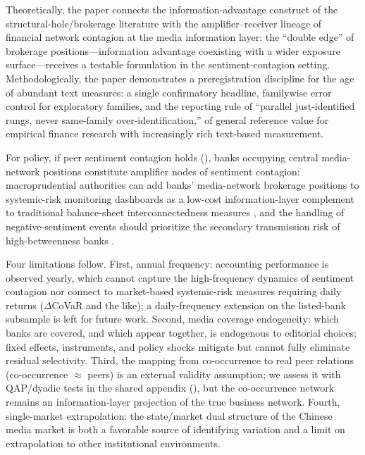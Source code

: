 Theoretically, the paper connects the information-advantage
construct of the structural-hole/brokerage literature with the
amplifier--receiver lineage of financial network contagion at the
media information layer: the ``double edge'' of brokerage
positions---information advantage coexisting with a wider exposure
surface---receives a testable formulation in the sentiment-contagion
setting. Methodologically, the paper demonstrates a preregistration
discipline for the age of abundant text measures: a single
confirmatory headline, familywise error control for exploratory
families, and the reporting rule of ``parallel just-identified rungs,
never same-family over-identification,'' of general reference value
for empirical finance research with increasingly rich text-based
measurement.

For policy, if peer sentiment contagion holds
(), banks occupying
central media-network positions constitute amplifier nodes of
sentiment contagion: macroprudential authorities can add banks'
media-network brokerage positions to systemic-risk monitoring
dashboards as a low-cost information-layer complement to traditional
balance-sheet interconnectedness measures
\parencite{jackson2021systemic,duarte2021firesale}, and the handling
of negative-sentiment events should prioritize the secondary
transmission risk of high-betweenness banks
\parencite{fang2024media,cookson2026social}.

Four limitations follow. First, annual frequency: accounting
performance is observed yearly, which cannot capture the
high-frequency dynamics of sentiment contagion nor connect to
market-based systemic-risk measures requiring daily returns
($\Delta$CoVaR and the like); a daily-frequency extension on the
listed-bank subsample is left for future work. Second, media
coverage endogeneity: which banks are covered, and which appear
together, is endogenous to editorial choices; fixed effects,
instruments, and policy shocks mitigate but cannot fully eliminate
residual selectivity. Third, the mapping from co-occurrence to real
peer relations (co-occurrence $\approx$ peers) is an external
validity assumption; we assess it with QAP/dyadic tests in the
shared appendix (), but the
co-occurrence network remains an information-layer projection of the
true business network. Fourth, single-market extrapolation: the
state/market dual structure of the Chinese media market
\parencite{you2018power} is both a favorable source of identifying
variation and a limit on extrapolation to other institutional
environments.

\printbibliography


